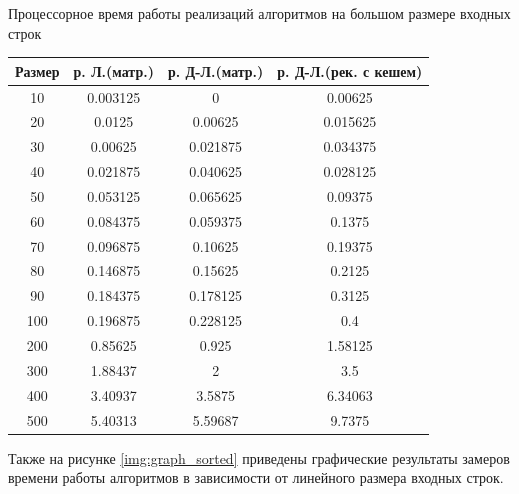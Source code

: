 \begin{center}
	\begin{threeparttable}
		\caption{Процессорное время работы реализаций алгоритмов на большом размере входных строк}
		\label{tbl:best1}
		\begin{tabular}{|c|c|c|c|}
			\hline
			Размер &р. Л.(матр.) &р. Д-Л.(матр.)  &р. Д-Л.(рек. с кешем)\\
			\hline
		 	10  &     0.003125     &         0   &     0.00625 \\
			\hline
			 20   &      0.0125   &     0.00625   &    0.015625 \\
			\hline
			30   &     0.00625   &    0.021875    &   0.034375  \\
			\hline
			40   &    0.021875  &     0.040625    &   0.028125\\
			\hline
			50    &   0.053125  &     0.065625   &     0.09375\\
			\hline
		 	60   &    0.084375  &     0.059375   &      0.1375\\
			\hline
			70    &   0.096875   &     0.10625    &    0.19375 \\
			\hline
			80    &   0.146875    &    0.15625    &     0.2125\\
			\hline
			 90   &    0.184375   &    0.178125   &      0.3125\\
			\hline
			100    &   0.196875   &    0.228125   &         0.4\\
			\hline
			200   &     0.85625    &      0.925   &     1.58125\\
			\hline
			300   &     1.88437    &          2   &         3.5\\
			\hline
			400    &    3.40937     &    3.5875   &     6.34063\\
			\hline
			500     &   5.40313     &   5.59687    &     9.7375\\
			\hline
		\end{tabular}
		
	\end{threeparttable}
\end{center}
Также на рисунке \ref{img:graph_sorted} приведены графические результаты замеров времени работы алгоритмов в зависимости от линейного размера входных строк.

